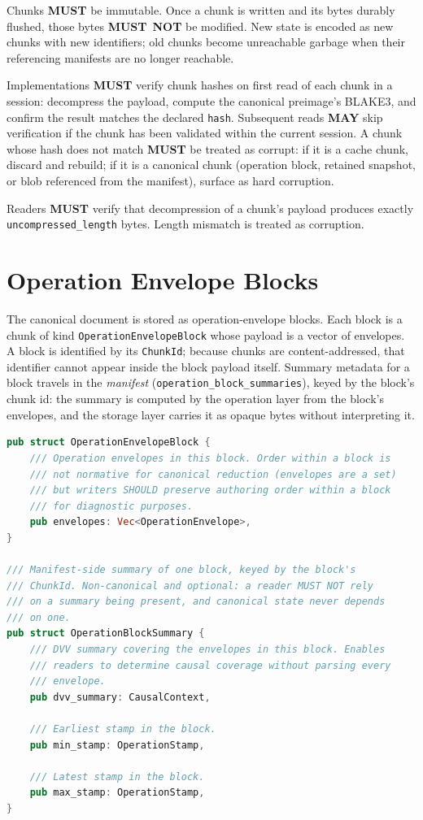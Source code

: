 \documentclass[11pt,letterpaper]{report}
\newcounter{requirement}[chapter]
\newcommand{\MUST}{\textbf{MUST}}
\newcommand{\MUSTNOT}{\textbf{MUST}\nobreak\ \textbf{NOT}}
\newcommand{\MAY}{\textbf{MAY}}
\begin{document}
\begin{requirement}
  \label{req:format:immutable-verified-chunks}
  Chunks \MUST{} be immutable. Once a chunk is written and its bytes
  durably flushed, those bytes \MUSTNOT{} be modified. New state
  is encoded as new chunks with new identifiers; old chunks become
  unreachable garbage when their referencing manifests are no
  longer reachable.

  Implementations \MUST{} verify chunk hashes on first read of each
  chunk in a session: decompress the payload, compute the canonical
  preimage's BLAKE3, and confirm the result matches the declared
  \texttt{hash}. Subsequent reads \MAY{} skip verification if the
  chunk has been validated within the current session. A chunk
  whose hash does not match \MUST{} be treated as corrupt: if it is
  a cache chunk, discard and rebuild; if it is a canonical chunk
  (operation block, retained snapshot, or blob referenced from the
  manifest), surface as hard corruption.

  Readers \MUST{} verify that decompression of a chunk's payload
  produces exactly \texttt{uncompressed\_length} bytes. Length
  mismatch is treated as corruption.
\end{requirement}

\section{Operation Envelope Blocks}
\label{sec:format:opblocks}

The canonical document is stored as operation-envelope blocks. Each
block is a chunk of kind \texttt{OperationEnvelopeBlock} whose
payload is a vector of envelopes. A block is identified by its
\texttt{ChunkId}; because chunks are content-addressed, that
identifier cannot appear inside the block payload itself. Summary
metadata for a block travels in the \emph{manifest}
(\texttt{operation\_block\_summaries}), keyed by the block's chunk
id: the summary is computed by the operation layer from the block's
envelopes, and the storage layer carries it as opaque bytes without
interpreting it.

\begin{lstlisting}[language=Rust]
pub struct OperationEnvelopeBlock {
    /// Operation envelopes in this block. Order within a block is
    /// not normative for canonical reduction (envelopes are a set)
    /// but writers SHOULD preserve authoring order within a block
    /// for diagnostic purposes.
    pub envelopes: Vec<OperationEnvelope>,
}

/// Manifest-side summary of one block, keyed by the block's
/// ChunkId. Non-canonical and optional: a reader MUST NOT rely
/// on a summary being present, and canonical state never depends
/// on one.
pub struct OperationBlockSummary {
    /// DVV summary covering the envelopes in this block. Enables
    /// readers to determine causal coverage without parsing every
    /// envelope.
    pub dvv_summary: CausalContext,

    /// Earliest stamp in the block.
    pub min_stamp: OperationStamp,

    /// Latest stamp in the block.
    pub max_stamp: OperationStamp,
}
\end{lstlisting}
\end{document}
